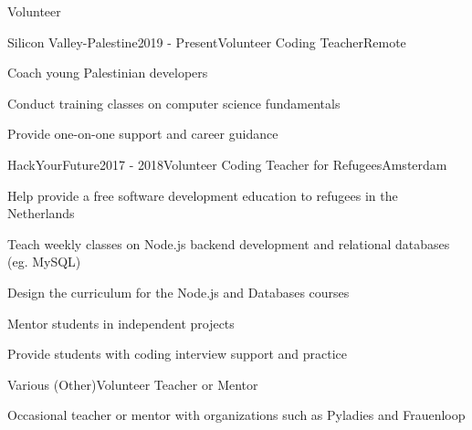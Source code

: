 \documentclass{resume} %
\begin{document}
\begin{rSection}{Volunteer}

    \begin{rSubsection}{{Silicon Valley-Palestine}}{2019 - Present}{Volunteer Coding Teacher}{Remote}
        \item Coach young Palestinian developers
        \item Conduct training classes on computer science fundamentals
        \item Provide one-on-one support and career guidance
    \end{rSubsection}


    \begin{rSubsection}{{HackYourFuture}}{2017 - 2018}{Volunteer Coding Teacher for Refugees}{Amsterdam}
        \item Help provide a free software development education to refugees in the Netherlands
        \item Teach weekly classes on Node.js backend development and relational databases (eg. MySQL)
        \item Design the curriculum for the Node.js and Databases courses
        \item Mentor students in independent projects
        \item Provide students with coding interview support and practice
    \end{rSubsection}

    \begin{rSubsection}{{Various (Other)}}{}{Volunteer Teacher or Mentor}{}
        \item Occasional teacher or mentor with organizations such as Pyladies and Frauenloop
    \end{rSubsection}


\end{rSection}

\end{document}
